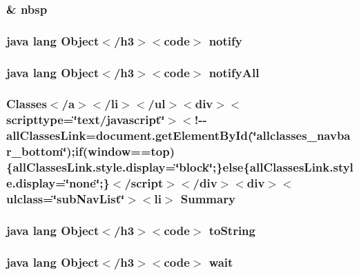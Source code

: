 \hypertarget{_event_8html_aef915316f784c9063d942974538301a6}{
\subsubsection[{nbsp}]{\setlength{\rightskip}{0pt plus 5cm}\& nbsp}}\label{_event_8html_aef915316f784c9063d942974538301a6}
\hypertarget{_event_8html_ae99ae10b5010594dbda4794e02db271b}{
\subsubsection[{notify}]{\setlength{\rightskip}{0pt plus 5cm}java lang Object$<$/h3$>$$<$code$>$ notify}}\label{_event_8html_ae99ae10b5010594dbda4794e02db271b}
\hypertarget{_event_8html_a1279357e6e09e33e75b55eb05fdb6436}{
\subsubsection[{notify\-All}]{\setlength{\rightskip}{0pt plus 5cm}java lang Object$<$/h3$>$$<$code$>$ notify\-All}}\label{_event_8html_a1279357e6e09e33e75b55eb05fdb6436}
\hypertarget{_event_8html_a6f9ab45abc9b0679dc1b132fbacfc681}{
\subsubsection[{Summary}]{\setlength{\rightskip}{0pt plus 5cm}Classes$<$/{\bf a}$>$$<$/li$>$$<$/ul$>$$<$div$>$$<$scripttype=\char`\"{}text/javascript\char`\"{}$>$$<$!-\/-\/all\-Classes\-Link=document.\-get\-Element\-By\-Id(\char`\"{}allclasses\-\_\-navbar\-\_\-bottom\char`\"{});if(window==top)\{all\-Classes\-Link.\-style.\-display=\char`\"{}block\char`\"{};\}else\{all\-Classes\-Link.\-style.\-display=\char`\"{}none\char`\"{};\}$<$/script$>$$<$/div$>$$<$div$>$$<$ulclass=\char`\"{}sub\-Nav\-List\char`\"{}$>$$<$li$>$ Summary}}\label{_event_8html_a6f9ab45abc9b0679dc1b132fbacfc681}
\hypertarget{_event_8html_a36e8a76a4132c9a7081416f27d087615}{
\subsubsection[{to\-String}]{\setlength{\rightskip}{0pt plus 5cm}java lang Object$<$/h3$>$$<$code$>$ to\-String}}\label{_event_8html_a36e8a76a4132c9a7081416f27d087615}
\hypertarget{_event_8html_a9a9f0c22e5688d478c707f910f1c1aea}{
\subsubsection[{wait}]{\setlength{\rightskip}{0pt plus 5cm}java lang Object$<$/h3$>$$<$code$>$ wait}}\label{_event_8html_a9a9f0c22e5688d478c707f910f1c1aea}
